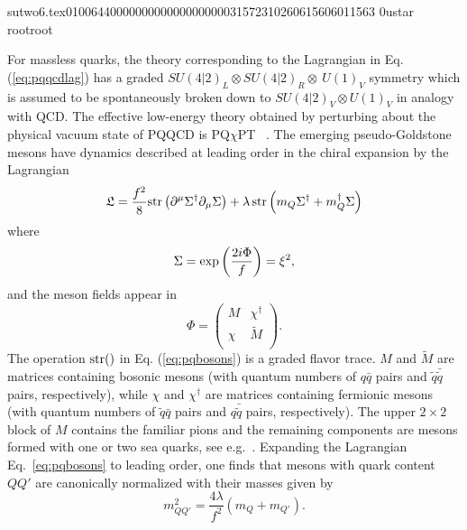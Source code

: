                                                                                                                                                                                                                                                                                       sutwo6.tex                                                                                          0100644 0000000 0000000 00000315723 10260615606 011563  0                                                                                                    ustar   root                            root                                                                                                                                                                                                                   \documentclass[prd,amssymb,amsmath,showpacs,nofootinbib,superscriptaddress]{revtex4}
\begin{document}
For massless quarks, the theory corresponding to the Lagrangian in
Eq. (\ref{eq:pqqcdlag}) has a 
graded $SU(4|2)_L \otimes SU(4|2)_R \otimes~U(1)_V$ symmetry which is
assumed to be spontaneously broken down to $SU(4|2)_V \otimes U(1)_V$
in analogy with QCD.  The effective low-energy theory obtained by
perturbing about the physical vacuum state of PQQCD is PQ$\chi$PT~%
\cite{Bernard:1993sv,Sharpe:1997by,Golterman:1997st, 
  Sharpe:2000bc,Sharpe:2001fh,Sharpe:2003vy}.
The emerging pseudo-Goldstone mesons have dynamics described 
at leading order in the chiral expansion by the Lagrangian
\begin{equation}
  \mathfrak{L} =
    \frac{f^2}{8} \str \left(
      \partial^\mu \S^\dagger \partial_\mu \S \right)
      + \l  \, \str \left( m_Q \S^\dagger + m_Q^\dagger \S \right)
\label{eq:pqbosons}
\end{equation}
where
\begin{equation}
  \S = \exp \left( \frac{2 i \Phi}{f} \right) = \xi^2
,\end{equation}
and the meson fields appear in
\begin{equation}
    \Phi =
    \begin{pmatrix}
      M & \chi^\dagger\\
      \chi & \tilde M\\
    \end{pmatrix}.
\end{equation}
The operation $\str( )$ in Eq. (\ref{eq:pqbosons}) is a graded flavor trace.  
$M$ and $\tilde M$ are
matrices containing bosonic mesons (with quantum numbers of $q \bar{q}$ pairs and 
$\tilde{q} \bar{\tilde{q}}$ pairs, respectively), while $\chi$ and $\chi^\dagger$
are matrices containing fermionic mesons (with quantum numbers of $\tilde q \bar{q}$
pairs and $q \bar{\tilde{q}}$ pairs, respectively).
The upper $2 \times 2$ block of $M$ contains the familiar
pions and the remaining components are mesons formed
with one or two sea quarks, see e.g.~\cite{Beane:2002vq}.
Expanding the Lagrangian Eq.~\eqref{eq:pqbosons} to leading order,
one finds that mesons with quark content $QQ'$ are canonically normalized
with their masses given by
\begin{equation}
m^2_{QQ'} = \frac{4 \lambda}{f^2} (m_Q + m_{Q'}) 
\label{eq:pqmesonmass}.
\end{equation}
\end{document}

